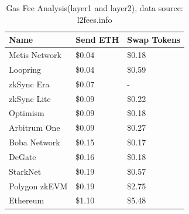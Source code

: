 \documentclass[preprint,12pt]{elsarticle}
\begin{document}
\begin{table}[htbp]
\centering
\begin{tabular}{|p{3cm}|p{2cm}|p{2cm}|}
\hline
\textbf{Name} & \textbf{Send ETH} & \textbf{Swap Tokens} \\
\hline
Metis Network & \$0.04 & \$0.18 \\
Loopring & \$0.04 & \$0.59 \\
zkSync Era & \$0.07 & - \\
zkSync Lite & \$0.09 & \$0.22 \\
Optimism & \$0.09 & \$0.18 \\
Arbitrum One & \$0.09 & \$0.27 \\
Boba Network & \$0.15 & \$0.17 \\
DeGate & \$0.16 & \$0.18 \\
StarkNet & \$0.19 & \$0.57 \\
Polygon zkEVM & \$0.19 & \$2.75 \\
Ethereum & \$1.10 & \$5.48 \\
\hline
\end{tabular}
\caption{Gas Fee Analysis(layer1 and layer2), data source: l2fees.info\cite{l2fees2024}}
\label{tab:gas-fee-analysis}
\end{table}
\end{document}

